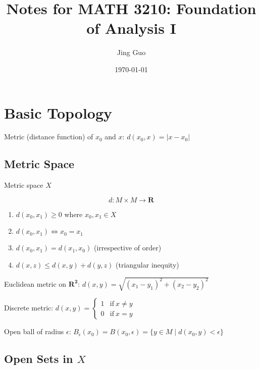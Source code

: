 \documentclass{article}
\title{Notes for MATH 3210: Foundation of Analysis I}
\author{Jing Guo}
\date{\today}
\begin{document}
	
	\maketitle
	\tableofcontents
	
	\section{Basic Topology}
	
	Metric (distance function) of $x_{0}$ and $x$: $d(x_{0}, x) = \lvert x - x_{0} \rvert$
	
	\subsection{Metric Space}
	
	Metric space $X$
	
	\begin{equation}
	d \colon M \times M \to \mathbf{R}
	\end{equation}
	
	\begin{enumerate}
		\item $d(x_{0}, x_{1}) \geq 0$ where $x_{0}, x_{1} \in X$
		\item $d(x_{0}, x_{1}) \iff x_{0} = x_{1}$
		\item $d(x_{0}, x_{1}) = d(x_{1}, x_{0})$ (irrespective of order)
		\item $d(x, z) \leq d(x, y) + d(y, z)$ (triangular inequity)
	\end{enumerate}

    Euclidean metric on $\mathbf{R^{2}}$:
        $d(x, y) = \sqrt{(x_{1} - y_{1})^{2} + (x_{2} - y_{2})^{2}}$
        
    Discrete metric: $d(x, y) = \left\{\begin{matrix}
    	1 &\mbox{if}\ x \neq y \\
    	0 &\mbox{if}\ x = y 
    	\end{matrix}\right.$
    	
    Open ball of radius $\epsilon$:
        $B_{\epsilon}(x_{0}) = B(x_{0}, \epsilon) = \{ y \in M \mid d(x_{0}, y) < \epsilon \}$
        
    \subsection{Open Sets in $X$}
    
    
	
\end{document}
